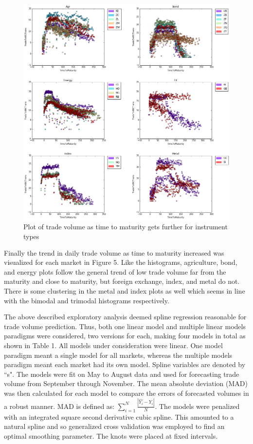 \documentclass[12pt]{article}
\begin{document}
\begin{figure}[H]
	\begin{center}	
		\includegraphics[width=15cm]{types_time_to_mat.png}
		\caption{Plot of trade volume as time to maturity gets further for instrument types}
		\label{fig:4}
	\end{center}
\end{figure}

Finally the trend in daily trade volume as time to maturity increased was visualized for each market in Figure 5. Like the histograms, agriculture, bond, and energy plots follow the general trend of low trade volume far from the maturity and close to maturity, but foreign exchange, index, and metal do not. There is some clustering in the metal and index plots as well which seems in line with the bimodal and trimodal histograms respectively.

The above described exploratory analysis deemed spline regression reasonable for trade volume prediction. Thus, both one linear model and multiple linear models paradigms were considered, two versions for each, making four models in total as shown in Table 1. All models under consideration were linear. One model paradigm meant a single model for all markets, whereas the multiple models paradigm meant each market had its own model. Spline variables are denoted by ``s". The models were fit on May to August data and used for forecasting trade volume from September through November. The mean absolute deviation (MAD) was then calculated for each model to compare the errors of forecasted volumes in a robust manner. MAD is defined as: $\displaystyle \sum_{i=1}^{N} \frac{|\hat{Y_i}-Y_i|}{N}$. The models were penalized with an integrated square second derivative cubic spline. This amounted to a natural spline and so generalized cross validation was employed to find an optimal smoothing parameter. The knots were placed at fixed intervals.
\end{document}
